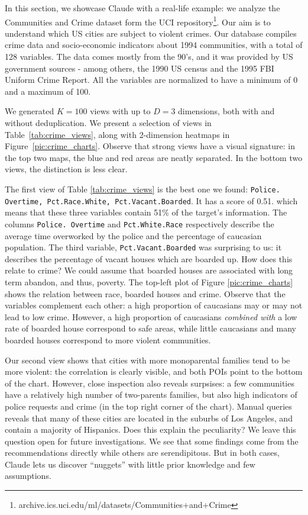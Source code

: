 In this section, we showcase Claude with a real-life example: we analyze the
Communities and Crime dataset form the UCI
repository\footnote{archive.ics.uci.edu/ml/datasets/Communities+and+Crime}.
Our aim is to understand which US cities are subject to violent crimes. Our
database compiles crime data and socio-economic indicators about 1994
communities, with a total of 128 variables. The data comes mostly from the
90's, and it was provided by US government sources - among others, the 1990 US
census and the 1995 FBI Uniform Crime Report. All the variables are
normalized to have a minimum of 0 and a maximum of 100.

We generated $K=100$ views with up to $D=3$ dimensions, both with and
without deduplication. We present a selection of views in
Table~\ref{tab:crime_views}, along with 2-dimension heatmaps in
Figure~\ref{pic:crime_charts}. Observe that strong views have a visual
signature: in the top two maps, the blue and red areas are neatly separated. In
the bottom two views, the distinction is less clear.

The first view of Table \ref{tab:crime_views} is the best one we found:
\texttt{Police. Overtime, Pct.Race.White, Pct.Vacant.Boarded}. It has a score
of 0.51. which means that these three variables contain 51\% of the target's
information. The columns \texttt{Police. Overtime} and \texttt{Pct.White.Race}
respectively describe the average time overworked by the police and the
percentage of caucasian population. The third variable,
\texttt{Pct.Vacant.Boarded} was surprising to us: it describes the
percentage of vacant houses which are boarded up.  How does this relate to
crime? We could assume that boarded houses are associated with long term
abandon, and thus, poverty. The top-left plot of Figure \ref{pic:crime_charts}
shows the relation between race, boarded houses and crime. Observe that the
variables complement each other: a high proportion of caucasians may or may not
lead to low crime. However, a high proportion of caucasians \emph{combined
with} a low rate of boarded house correspond to safe areas, while little
caucasians and many boarded houses correspond to more violent communities.

Our second view shows that cities with more monoparental families tend to be
more violent: the correlation is clearly visible, and both POIs point to the
bottom of the chart. However, close inspection also reveals surpsises: a few
communities have a relatively high number of two-parents families, but also
high indicators of police requests and crime (in the top right corner of the
chart). Manual queries reveals that many of these cities are located in the
suburbs of Los Angeles, and contain a majority of Hispanics. Does this explain
the peculiarity? We leave this question open for future investigations. We see
that some findings come from the recommendations directly while others are
serendipitous.  But in both cases, Claude lets us discover ``nuggets'' with
little prior knowledge and few assumptions. 

